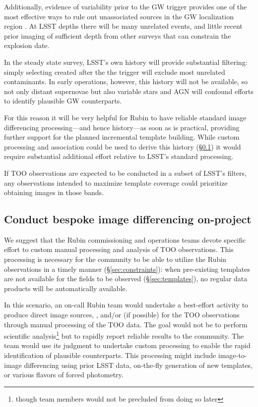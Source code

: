 \documentclass[DM,authoryear,toc]{lsstdoc}
\begin{document}
Additionally, evidence of variability prior to the GW trigger provides one of the most effective ways to rule out unassociated sources in the GW localization region \citep[e.g.,][]{2019GCN.24223....1C, 2019GCN.26430....1S}.
At LSST depths there will be many unrelated events, and little recent prior imaging of sufficient depth from other surveys that can constrain the explosion date.

In the steady state survey, LSST's own history will provide substantial filtering: simply selecting \DIAObjects created after the the trigger will exclude most unrelated contaminants.
In early operations, however, this history will not be available, so not only distant supernovae but also variable stars and AGN will confound efforts to identify plausible GW counterparts.

For this reason it will be very helpful for Rubin to have reliable standard image differencing processing---and hence history---as soon as is practical, providing further support for the planned incremental template building.
While custom processing and association could be used to derive this history (\S \ref{sec:processing}) it would require substantial additional effort relative to LSST's standard processing.

If TOO observations are expected to be conducted in a subset of LSST's filters, any observations intended to maximize template coverage could prioritize obtaining images in those bands.

\subsection{Conduct bespoke image differencing on-project} \label{sec:processing}

We suggest that the Rubin commissioning and operations teams devote specific effort to custom manual processing and analysis of TOO observations.
This processing is necessary for the community to be able to utilize the Rubin observations in a timely manner (\S \ref{sec:constraints}): when pre-existing templates are not available for the fields to be observed (\S \ref{sec:templates}), no regular data products will be automatically available.

In this scenario, an on-call Rubin team would undertake a best-effort activity to produce direct image sources, \DIASources, and/or \DIAObjects (if possible) for the TOO observations through manual processing of the TOO data.
The goal would not be to perform scientific analysis\footnote{though team members would not be precluded from doing so later} but to rapidly report reliable results to the community.
The team would use its judgment to undertake custom processing to enable the rapid identification of plausible counterparts.
This processing might include image-to-image differencing using prior LSST data, on-the-fly generation of new templates, or various flavors of forced photometry.
\end{document}
